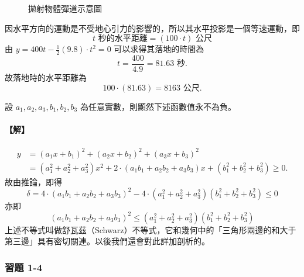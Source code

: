 \begin{figure}[htbp]
\centering
{}
\caption{拋射物體彈道示意圖}
\label{fig:trajectory}
\end{figure}

因水平方向的運動是不受地心引力的影響的，所以其水平投影是一個等速運動，即
\[
t\text{ 秒的水平距離} = (100\cdot t)\text{ 公尺}
\]
由 $y = 400t - \frac{1}{2}(9.8)\cdot t^2 = 0$ 可以求得其落地的時間為
\[
t = \frac{400}{4.9} = 81.63\text{ 秒}.
\]
故落地時的水平距離為
\[
100\cdot (81.63) = 8163 \text{ 公尺}.
\]

\begin{example}\label{ex:b2_1-4-3}
設 $a_1, a_2, a_3, b_1, b_2, b_3$ 為任意實數，則顯然下述函數值永不為負。
\end{example}
\paragraph{【解】}
\begin{align*}
y &= (a_1 x+b_1)^2 + (a_2 x+b_2)^2 + (a_3 x+b_3)^2 \\
&= (a_1^2+a_2^2+a_3^2)x^2 + 2\cdot (a_1 b_1 + a_2 b_2 + a_3 b_3)x + (b_1^2+b_2^2+b_3^2) \ge 0.
\end{align*}
故由推論，即得
\[
\delta = 4\cdot (a_1 b_1 + a_2 b_2 + a_3 b_3)^2 - 4\cdot (a_1^2+a_2^2+a_3^2)(b_1^2+b_2^2+b_3^2) \le 0
\]
亦即
\[
(a_1 b_1 + a_2 b_2 + a_3 b_3)^2 \le (a_1^2+a_2^2+a_3^2)(b_1^2+b_2^2+b_3^2)
\]
上述不等式叫做舒瓦茲（Schwarz）不等式，它和幾何中的「三角形兩邊的和大于第三邊」具有密切關連。以後我們還會對此詳加剖析的。


\subsubsection*{習題 1-4}\label{sec:b2_ex1-4}

